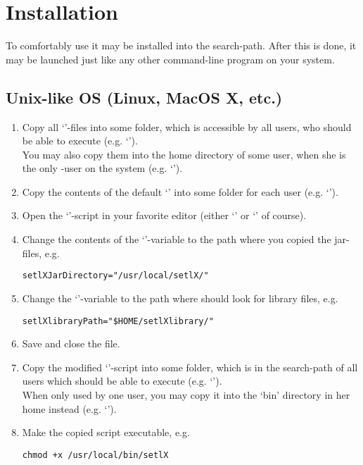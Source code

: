 \section{Installation}

To comfortably use \setlX{} it may be installed into the search-path. After this is done, it may be launched just like any other command-line program on your system.

\subsection{Unix-like OS (Linux, MacOS X, etc.)}\label{Unix}

\begin{enumerate}
	\item Copy all `'-files into some folder, which is accessible by all users, who should be able to execute \setlX{} (e.g. `').\\
	You may also copy them into the home directory of some user, when she is the only \setlX-user on the system (e.g. `').
	\item Copy the contents of the default `' into some folder for each user (e.g. `').
	\item Open the `'-script in your favorite editor (either `' or `' of course).
	\item Change the contents of the `'-variable to the path where you copied the jar-files, e.g.
\begin{lstlisting}[frame=none,numbers=none]
setlXJarDirectory="/usr/local/setlX/"
\end{lstlisting}
	\item Change the `'-variable to the path where \setlX{} should look for library files, e.g.
\begin{lstlisting}[frame=none,numbers=none]
setlXlibraryPath="$HOME/setlXlibrary/"
\end{lstlisting}
	\item Save and close the file.
	\item Copy the modified `'-script into some folder, which is in the search-path of all users which should be able to execute \setlX{} (e.g. `').\\
	When only used by one user, you may copy it into the `bin' directory in her home instead (e.g. `').
	\item Make the copied script executable, e.g.
\begin{lstlisting}[frame=none,numbers=none]
chmod +x /usr/local/bin/setlX
\end{lstlisting}

\end{enumerate}


